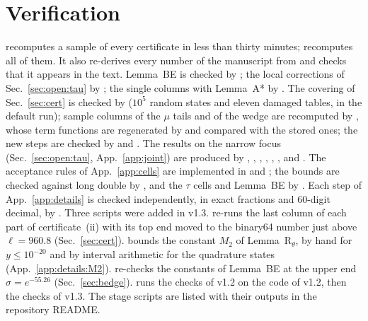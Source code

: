 \section{Verification}
\label{app:verification}

 recomputes a sample of every certificate in less than thirty minutes;  recomputes all of them.
It also re-derives every number of the manuscript from  and checks that it appears in the text.
Lemma~BE is checked by ; the local corrections of Sec.~\ref{sec:open:tau} by ; the single columns with Lemma~A* by .
The covering of Sec.~\ref{sec:cert} is checked by  ($10^5$ random states and eleven damaged tables, in the default run); sample columns of the $\mu$ tails and of the wedge are recomputed by , whose term functions are regenerated by  and compared with the stored ones; the new steps are checked by  and .
The results on the narrow focus (Sec.~\ref{sec:open:tau}, App.~\ref{app:joint}) are produced by , , , , , ,  and .
The acceptance rules of App.~\ref{app:cells} are implemented in  and ; the bounds are checked against long double by , and the $\tau$ cells and Lemma~BE by .
Each step of App.~\ref{app:details} is checked independently, in exact fractions and $60$-digit decimal, by .
Three scripts were added in v1.3.
 re-runs the last column of each part of certificate~(ii) with its top end moved to the binary64 number just above $\ell=960.8$ (Sec.~\ref{sec:cert}).
 bounds the constant $M_2$ of Lemma~R$_\theta$, by hand for $y\le10^{-20}$ and by interval arithmetic for the quadrature states (App.~\ref{app:details:M2}).
 re-checks the constants of Lemma~BE at the upper end $\sigma=e^{-55.26}$ (Sec.~\ref{sec:bedge}).
 runs the checks of v1.2 on the code of v1.2, then the checks of v1.3.
The stage scripts are listed with their outputs in the repository README.
